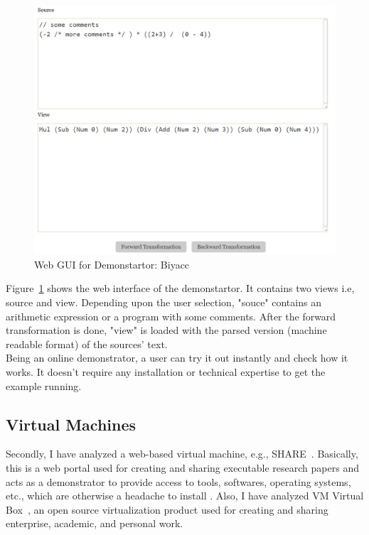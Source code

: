 \begin{figure}
	\includegraphics[width=1\textwidth]{figures/Biyacc}
	\caption{Web GUI for Demonstartor: Biyacc}
	\label{fig:WebGUI_Biyacc}
\end{figure}

Figure~\ref{fig:WebGUI_Biyacc} shows the web interface of the demonstartor. It contains two views i.e, source and view. Depending upon the user selection, "souce" contains an arithmetic expression or a program with some comments. After the forward transformation is done, "view" is loaded with the parsed version (machine readable format) of the sources' text.\\  
Being an online demonstrator, a user can try it out instantly and check how it works. It doesn't require any installation or technical expertise to get the example running.

\subsection{Virtual Machines}\label{subsec:virtualmachines}
Secondly, I have analyzed a web-based virtual machine, e.g., SHARE~\cite{share}. Basically, this is a web portal used for creating and sharing executable research papers and acts as a demonstrator to provide access to tools, softwares, operating systems, etc., which are otherwise a headache to install \cite{share}. Also, I have analyzed VM Virtual Box~\cite{virtualbox}, an open source virtualization product used for creating and sharing enterprise, academic, and personal work. 

